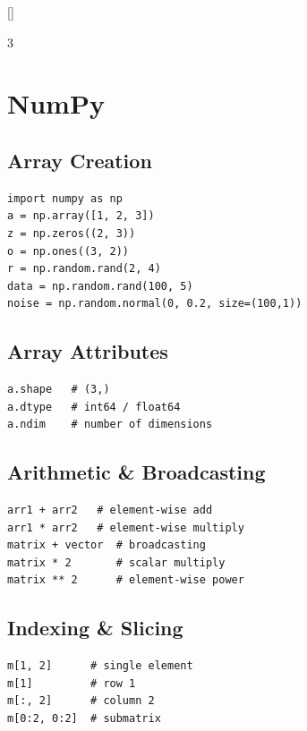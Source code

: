 \documentclass[6pt,landscape,a4paper]{extarticle}
\begin{document}
\titleformat{\section}{\bfseries\normalsize}{}{0em}{}[\titlerule]
\titleformat{\subsection}{\bfseries\small}{}{0em}{}
\begin{multicols}{3}

\section{NumPy}

\subsection{Array Creation}
\begin{lstlisting}
import numpy as np
a = np.array([1, 2, 3])
z = np.zeros((2, 3))
o = np.ones((3, 2))
r = np.random.rand(2, 4)
data = np.random.rand(100, 5)
noise = np.random.normal(0, 0.2, size=(100,1))
\end{lstlisting}

\subsection{Array Attributes}
\begin{lstlisting}
a.shape   # (3,)
a.dtype   # int64 / float64
a.ndim    # number of dimensions
\end{lstlisting}

\subsection{Arithmetic \& Broadcasting}
\begin{lstlisting}
arr1 + arr2   # element-wise add
arr1 * arr2   # element-wise multiply
matrix + vector  # broadcasting
matrix * 2       # scalar multiply
matrix ** 2      # element-wise power
\end{lstlisting}

\subsection{Indexing \& Slicing}
\begin{lstlisting}
m[1, 2]      # single element
m[1]         # row 1
m[:, 2]      # column 2
m[0:2, 0:2]  # submatrix
\end{lstlisting}


\end{multicols}
\end{document}
